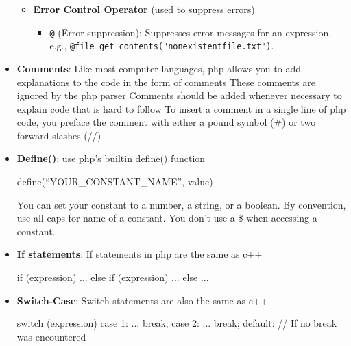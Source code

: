 \documentclass{report}
\begin{document}
\begin{itemize}
\begin{itemize}
                \item \textbf{Error Control Operator} (used to suppress errors)
                    \begin{itemize}
                        \item \texttt{@} (Error suppression): Suppresses error messages for an expression, e.g., \texttt{@file\_get\_contents("nonexistentfile.txt")}.
                    \end{itemize}
            \end{itemize}
        \item \textbf{Comments}: Like most computer languages, php allows you to add explanations to the code in the form of comments
            These comments are ignored by the php parser
            \bigbreak \noindent 
            Comments should be added whenever necessary to explain code that is hard to follow
            \bigbreak \noindent 
            To insert a comment in a single line of php code, you preface the comment with either a pound symbol (\#) or two forward slashes (//)
        \item \textbf{Define()}:
            use php's builtin define() function
            \bigbreak \noindent 
            \begin{bashcode}
                define(“YOUR_CONSTANT_NAME”, value)
            \end{bashcode}
            You can set your constant to a number, a string, or a boolean.
            \bigbreak \noindent 
            By convention, use all caps for name of a constant.
            \bigbreak \noindent 
            You don't use a \$ when accessing a constant.
        \item \textbf{If statements}: If statements in php are the same as c++
            \bigbreak \noindent 
            \begin{bashcode}
                if (expression) {
                    ...
                } else if (expression) {
                    ...
                } else {
                    ...
                }
            \end{bashcode}
        \item \textbf{Switch-Case}: Switch statements are also the same as c++
            \bigbreak \noindent 
            \begin{bashcode}
                switch (expression) {
                    case 1:
                        ...
                        break;
                    case 2: 
                        ...
                        break;
                    default: // If no break was encountered
}
\end{bashcode}
\end{itemize}
\end{document}
